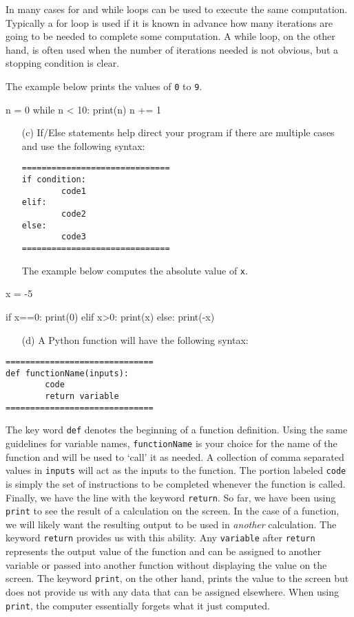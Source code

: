 \documentclass{ximera}
\begin{document}
In many cases for and while loops can be used to execute the same computation. Typically a for loop is used if it is known in advance how many iterations are going to be needed to complete some computation. A while loop, on the other hand, is often used when the number of iterations needed is not obvious, but a stopping condition is clear.

The example below prints the values of \verb|0| to \verb|9|.

\begin{sageCell}
n = 0
while n < 10:
        print(n)
        n += 1
\end{sageCell}

	\begin{enumerate}
		\item[(c)] If/Else statements help direct your program if there are multiple cases and use the following syntax:
\begin{verbatim}
==============================
if condition:
        code1
elif:
        code2
else:
        code3
==============================
\end{verbatim}

The example below computes the absolute value of \verb|x|.
	\end{enumerate}

\begin{sageCell}
x = -5
	
if x==0:
        print(0)
elif x>0:
        print(x)
else:
        print(-x)
\end{sageCell}

	\begin{enumerate}
        	\item[(d)] A Python function will have the following syntax:
	\end{enumerate}

\begin{verbatim}
==============================
def functionName(inputs):
        code
        return variable
==============================
\end{verbatim}

The key word \verb|def| denotes the beginning of a function definition. Using the same guidelines for variable names, \verb|functionName| is your choice for the name of the function and will be used to `call' it as needed. A collection of comma separated values in \verb|inputs| will act as the inputs to the function.  The portion labeled \verb|code| is simply the set of instructions to be completed whenever the function is called. Finally, we have the line with the keyword \verb|return|. So far, we have been using \verb|print| to see the result of a calculation on the screen. In the case of a function, we will likely want the resulting output to be used in {\em another} calculation. The keyword \verb|return| provides us with this ability. Any \verb|variable| after \verb|return| represents the output value of the function and can be assigned to another variable or passed into another function without displaying the value on the screen. The keyword \verb|print|, on the other hand, prints the value to the screen but does not provide us with any data that can be assigned elsewhere. When using \verb|print|, the computer essentially forgets what it just computed.
\end{document}
